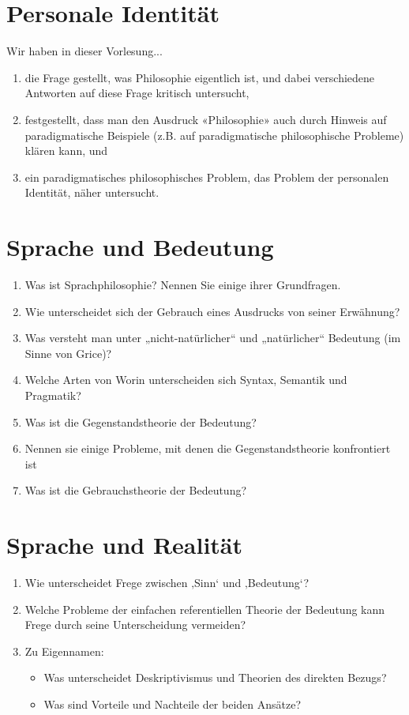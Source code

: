 \documentclass[../main.tex]{subfiles}
\begin{document}
\section{Personale Identität} %
Wir haben in dieser Vorlesung...
\begin{enumerate}
	\item die Frage gestellt, was Philosophie eigentlich ist, und dabei verschiedene Antworten auf diese Frage kritisch untersucht,
	\item festgestellt, dass man den Ausdruck «Philosophie» auch durch Hinweis auf paradigmatische Beispiele (z.B. auf paradigmatische philosophische Probleme) klären kann, und
	\item ein paradigmatisches philosophisches Problem, das Problem der personalen Identität, näher untersucht.
\end{enumerate}

\section{Sprache und Bedeutung}
\begin{enumerate}
	\item Was ist Sprachphilosophie? Nennen Sie einige ihrer Grundfragen.
	\item Wie unterscheidet sich der Gebrauch eines Ausdrucks von seiner Erwähnung?
	\item Was versteht man unter „nicht-natürlicher“ und „natürlicher“ Bedeutung (im Sinne von Grice)?
	\item Welche Arten von Worin unterscheiden sich Syntax, Semantik und Pragmatik?
	\item Was ist die Gegenstandstheorie der Bedeutung?
	\item Nennen sie einige Probleme, mit denen die Gegenstandstheorie konfrontiert ist
	\item Was ist die Gebrauchstheorie der Bedeutung?
\end{enumerate}

\section{Sprache und Realität} 
\begin{enumerate}
	\item Wie unterscheidet Frege zwischen ‚Sinn‘ und ‚Bedeutung‘?
	\item Welche Probleme der einfachen referentiellen Theorie der Bedeutung kann Frege durch seine Unterscheidung vermeiden?
	\item Zu Eigennamen:
	\begin{itemize}
		\item Was unterscheidet Deskriptivismus und Theorien des direkten Bezugs?
		\item Was sind Vorteile und Nachteile der beiden Ansätze?
	\end{itemize}
\end{enumerate}
\end{document}
